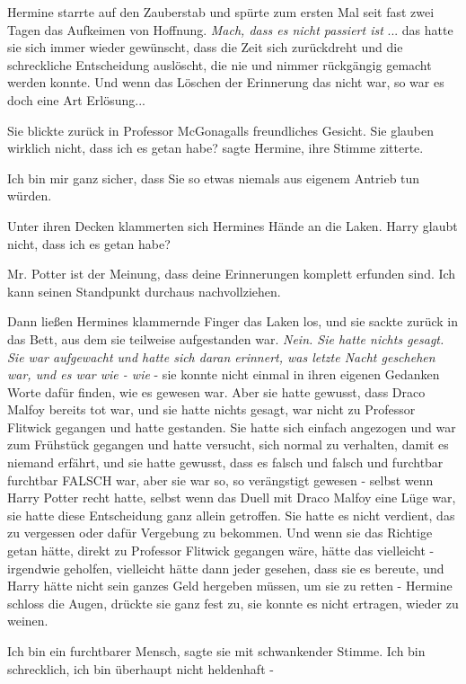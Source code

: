 Hermine starrte auf den Zauberstab und spürte zum ersten Mal seit fast zwei
Tagen das Aufkeimen von Hoffnung. \emph{Mach, dass es nicht passiert ist} ...
das hatte sie sich immer wieder gewünscht, dass die Zeit sich zurückdreht und
die schreckliche Entscheidung auslöscht, die nie und nimmer rückgängig gemacht
werden konnte. Und wenn das Löschen der Erinnerung das nicht war, so war es doch
eine Art Erlösung...

Sie blickte zurück in Professor McGonagalls freundliches Gesicht. \glqq{}Sie
glauben wirklich nicht, dass ich es getan habe?\grqq{} sagte Hermine, ihre
Stimme zitterte.

\glqq{}Ich bin mir ganz sicher, dass Sie so etwas niemals aus eigenem Antrieb tun
würden.\grqq{}

Unter ihren Decken klammerten sich Hermines Hände an die Laken. \glqq{}Harry
glaubt nicht, dass ich es getan habe?\grqq{}

\glqq{}Mr. Potter ist der Meinung, dass deine Erinnerungen komplett erfunden
sind. Ich kann seinen Standpunkt durchaus nachvollziehen.\grqq{}

Dann ließen Hermines klammernde Finger das Laken los, und sie sackte zurück in
das Bett, aus dem sie teilweise aufgestanden war. \emph{Nein. Sie hatte nichts
gesagt. Sie war aufgewacht und hatte sich daran erinnert, was letzte Nacht
geschehen war, und es war wie - wie} - sie konnte nicht einmal in ihren eigenen
Gedanken Worte dafür finden, wie es gewesen war. Aber sie hatte gewusst, dass
Draco Malfoy bereits tot war, und sie hatte nichts gesagt, war nicht zu
Professor Flitwick gegangen und hatte gestanden. Sie hatte sich einfach
angezogen und war zum Frühstück gegangen und hatte versucht, sich normal zu
verhalten, damit es niemand erfährt, und sie hatte gewusst, dass es falsch und
falsch und furchtbar furchtbar FALSCH war, aber sie war so, so verängstigt
gewesen - selbst wenn Harry Potter recht hatte, selbst wenn das Duell mit Draco
Malfoy eine Lüge war, sie hatte diese Entscheidung ganz allein getroffen. Sie
hatte es nicht verdient, das zu vergessen oder dafür Vergebung zu bekommen. Und
wenn sie das Richtige getan hätte, direkt zu Professor Flitwick gegangen wäre,
hätte das vielleicht - irgendwie geholfen, vielleicht hätte dann jeder gesehen,
dass sie es bereute, und Harry hätte nicht sein ganzes Geld hergeben müssen, um
sie zu retten - Hermine schloss die Augen, drückte sie ganz fest zu, sie konnte
es nicht ertragen, wieder zu weinen.

\glqq{}Ich bin ein furchtbarer Mensch\grqq{}, sagte sie mit schwankender Stimme.
\glqq{}Ich bin schrecklich, ich bin überhaupt nicht heldenhaft -\grqq{}

